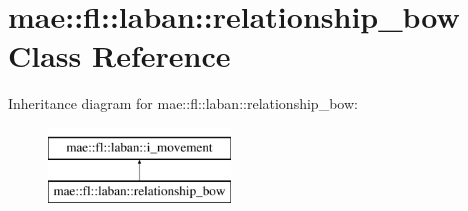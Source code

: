 \hypertarget{classmae_1_1fl_1_1laban_1_1relationship__bow}{\section{mae\-:\-:fl\-:\-:laban\-:\-:relationship\-\_\-bow Class Reference}
\label{classmae_1_1fl_1_1laban_1_1relationship__bow}
}
Inheritance diagram for mae\-:\-:fl\-:\-:laban\-:\-:relationship\-\_\-bow\-:\begin{figure}[H]
\begin{center}
\leavevmode
\includegraphics[height=2.000000cm]{classmae_1_1fl_1_1laban_1_1relationship__bow}
\end{center}
\end{figure}
